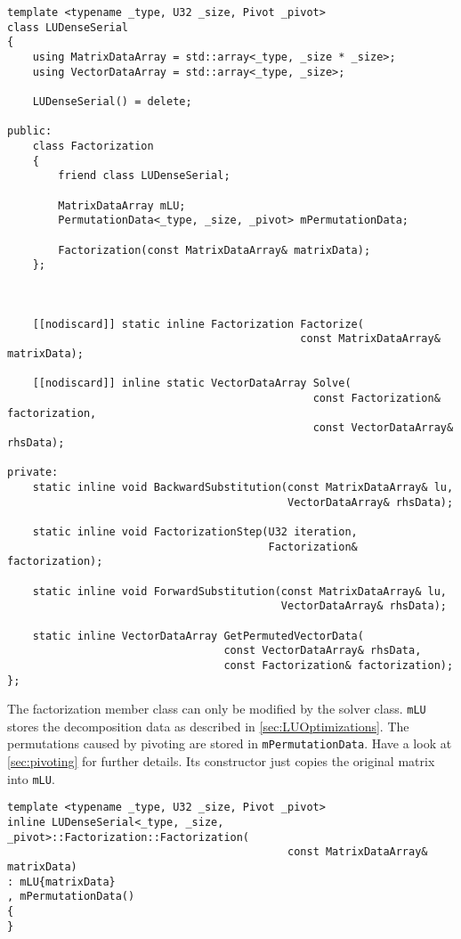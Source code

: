 \begin{verbatim}
template <typename _type, U32 _size, Pivot _pivot>
class LUDenseSerial
{
    using MatrixDataArray = std::array<_type, _size * _size>;
    using VectorDataArray = std::array<_type, _size>;
	
    LUDenseSerial() = delete;
	
public:
    class Factorization
    {
        friend class LUDenseSerial;
		
        MatrixDataArray mLU;
        PermutationData<_type, _size, _pivot> mPermutationData;
		
        Factorization(const MatrixDataArray& matrixData);
    };
	
	
	
    [[nodiscard]] static inline Factorization Factorize(
                                              const MatrixDataArray& matrixData);
	
    [[nodiscard]] inline static VectorDataArray Solve(
                                                const Factorization& factorization,
                                                const VectorDataArray& rhsData);
	
private:
    static inline void BackwardSubstitution(const MatrixDataArray& lu, 
                                            VectorDataArray& rhsData);
	
    static inline void FactorizationStep(U32 iteration, 
                                         Factorization& factorization);
	
    static inline void ForwardSubstitution(const MatrixDataArray& lu, 
                                           VectorDataArray& rhsData);
	
    static inline VectorDataArray GetPermutedVectorData(
                                  const VectorDataArray& rhsData,
                                  const Factorization& factorization);
};
\end{verbatim}

\newpage 
The factorization member class can only be modified by the solver class.
\texttt{mLU} stores the decomposition data as described in \cref{sec:LUOptimizations}.
The permutations caused by pivoting are stored in \texttt{mPermutationData}.
Have a look at \cref{sec:pivoting} for further details.
Its constructor just copies the original matrix into \texttt{mLU}.

\begin{verbatim}
template <typename _type, U32 _size, Pivot _pivot>
inline LUDenseSerial<_type, _size, _pivot>::Factorization::Factorization(
                                            const MatrixDataArray& matrixData)
: mLU{matrixData}
, mPermutationData()
{
}
\end{verbatim}

